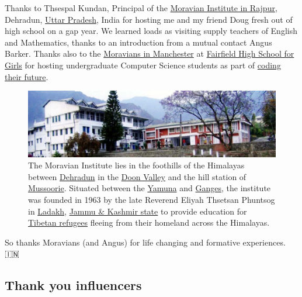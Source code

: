 \documentclass[
]{book}
\begin{document}
Thanks to Thsespal Kundan, Principal of the \href{https://moravianinstitute.com/}{Moravian Institute in Rajpur}, Dehradun, \href{https://en.wikipedia.org/wiki/Uttar_Pradesh}{Uttar Pradesh}, India for hosting me and my friend Doug fresh out of high school on a gap year. We learned loads as visiting supply teachers of English and Mathematics, thanks to an introduction from a mutual contact Angus Barker. Thanks also to the \href{https://en.wikipedia.org/wiki/Fairfield_Moravian_Church}{Moravians in Manchester} at \href{https://en.wikipedia.org/wiki/Fairfield_High_School_for_Girls}{Fairfield High School for Girls} for hosting undergraduate Computer Science students as part of \href{http://www.cs.man.ac.uk/~hulld/coding-their-future.html}{coding their future}.

\begin{figure}

{\centering \includegraphics[width=1\linewidth]{images/moravian-insitute} 

}

\caption{The Moravian Institute lies in the foothills of the Himalayas between \href{https://en.wikipedia.org/wiki/Dehradun}{Dehradun} in the \href{https://en.wikipedia.org/wiki/Doon_Valley}{Doon Valley} and the hill station of \href{https://en.wikipedia.org/wiki/Mussoorie}{Mussoorie}. Situated between the \href{https://en.wikipedia.org/wiki/Yamuna}{Yamuna} and \href{https://en.wikipedia.org/wiki/Ganges}{Ganges}, the institute was founded in 1963 by the late Reverend Eliyah Thsetsan Phuntsog in \href{https://en.wikipedia.org/wiki/Ladakh}{Ladakh}, \href{https://en.wikipedia.org/wiki/Jammu_and_Kashmir_(state)}{Jammu \& Kashmir state} to provide education for \href{https://en.wikipedia.org/wiki/Tibetan_diaspora}{Tibetan refugees} fleeing from their homeland across the Himalayas.}\label{fig:moravian-fig}
\end{figure}



So thanks Moravians (and Angus) for life changing and formative experiences. 🇮🇳🙏

\hypertarget{influences}{%
\subsection{Thank you influencers}\label{influences}}
\end{document}
